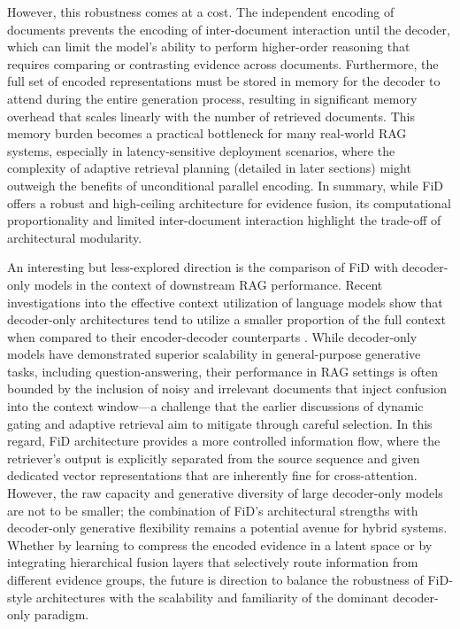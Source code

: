 \documentclass[11pt,a4paper]{article}
\begin{document}
However, this robustness comes at a cost. The independent encoding of documents prevents the encoding of inter-document interaction until the decoder, which can limit the model's ability to perform higher-order reasoning that requires comparing or contrasting evidence across documents. Furthermore, the full set of encoded representations must be stored in memory for the decoder to attend during the entire generation process, resulting in significant memory overhead that scales linearly with the number of retrieved documents. This memory burden becomes a practical bottleneck for many real-world RAG systems, especially in latency-sensitive deployment scenarios, where the complexity of adaptive retrieval planning (detailed in later sections) might outweigh the benefits of unconditional parallel encoding. In summary, while FiD offers a robust and high-ceiling architecture for evidence fusion, its computational proportionality and limited inter-document interaction highlight the trade-off of architectural modularity.

An interesting but less-explored direction is the comparison of FiD with decoder-only models in the context of downstream RAG performance. Recent investigations into the effective context utilization of language models show that decoder-only architectures tend to utilize a smaller proportion of the full context when compared to their encoder-decoder counterparts \cite{arxiv:2407.16833v1,arxiv:2309.01431v2}. While decoder-only models have demonstrated superior scalability in general-purpose generative tasks, including question-answering, their performance in RAG settings is often bounded by the inclusion of noisy and irrelevant documents that inject confusion into the context window---a challenge that the earlier discussions of dynamic gating and adaptive retrieval aim to mitigate through careful selection. In this regard, FiD architecture provides a more controlled information flow, where the retriever's output is explicitly separated from the source sequence and given dedicated vector representations that are inherently fine for cross-attention. However, the raw capacity and generative diversity of large decoder-only models are not to be smaller; the combination of FiD's architectural strengths with decoder-only generative flexibility remains a potential avenue for hybrid systems. Whether by learning to compress the encoded evidence in a latent space or by integrating hierarchical fusion layers that selectively route information from different evidence groups, the future is direction to balance the robustness of FiD-style architectures with the scalability and familiarity of the dominant decoder-only paradigm.
\end{document}
